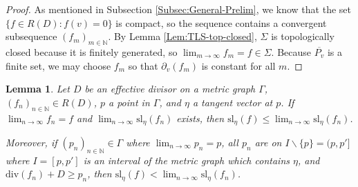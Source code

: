 \documentclass{amsart}
\newtheorem{lemma}[theorem]{Lemma}
\begin{document}
	\begin{proof}
		As mentioned in Subsection \ref{Subsec:General-Prelim}, we know that the set $\{ f \in R(D) : f(v) = 0 \}$ is compact, so the sequence contains a convergent subsequence $(f_m)_{m \in \mathbb{N}}$. By Lemma \ref{Lem:TLS-top-closed}, $\Sigma$ is topologically closed because it is finitely generated, so $\displaystyle \lim_{m \to \infty} f_m = f \in \Sigma$. Because $\overline{P_v}$ is a finite set, we may choose $f_m$ so that $\partial_v(f_m)$ is constant for all $m$.
	\end{proof}
	
	\begin{lemma}
		\label{Lem:Limits-2}
		Let $D$ be an effective divisor on a metric graph $\Gamma$, $(f_n)_{n \in \mathbb{N}} \in R(D)$, $p$ a point in $\Gamma$, and $\eta$ a tangent vector at $p$. If $\displaystyle \lim_{n \to \infty} f_n = f$ and $\displaystyle \lim_{n \to \infty} \mathrm{sl}_{\eta}(f_n)$ exists, then $\displaystyle \mathrm{sl}_{\eta}(f) \leq \lim_{n \to \infty} \mathrm{sl}_{\eta}(f_n)$.
		
		Moreover, if $(p_n)_{n \in \mathbb{N}} \in \Gamma$ where $\displaystyle \lim_{n \to \infty} p_n = p$, all $p_n$ are on $I \backslash \{ p \} = (p,p']$ where $I = [p,p']$ is an interval of the metric graph which contains $\eta$, and $\mathrm{div}(f_n) + D \geq p_n$, then $\displaystyle \mathrm{sl}_{\eta}(f) < \lim_{n \to \infty} \mathrm{sl}_{\eta}(f_n)$.
	\end{lemma}
	
\end{document}
